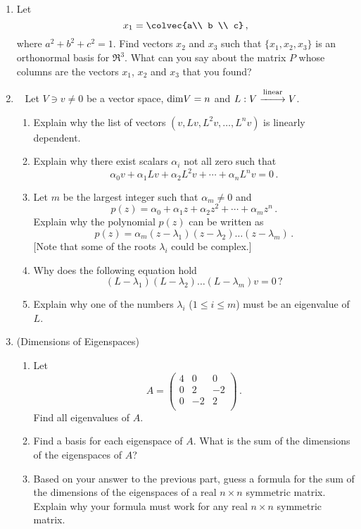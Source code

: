 \begin{enumerate}


\item Let $$x_1=\colvec{a\\ b \\ c}\, ,$$ where $a^2+b^2+c^2=1$.  Find vectors $x_2$ and $x_3$ such that $\{x_1,x_2,x_3\}$ is an orthonormal basis for $\Re^3$. What can you say about the matrix $P$ whose columns are the vectors $x_1$, $x_2$ and $x_3$ that you found?

\item~\label{atleastone} Let $V\ni v\neq0$ be a vector space, ${\rm dim} V=n$ and $L:V\stackrel{\rm linear}{-\!\!-\!\!\!\longrightarrow}V$.
\begin{enumerate}
\item Explain why the list of vectors $(v,Lv,L^2v,\ldots,L^n v)$ is linearly dependent.
\item Explain why there exist scalars $\alpha_i$ not all zero such that
$$
\alpha_0 v + \alpha_1 L v+\alpha_2 L^2 v+\cdots + \alpha_n L^n v=0\, .
$$
\item Let $m$ be the largest integer such that $\alpha_m\neq0$ and $$p(z)=\alpha_0+ \alpha_1 z + \alpha_2 z^2+\cdots + \alpha_m z^n \, .$$
Explain why the polynomial $p(z)$ can be written as
$$
p(z)=\alpha_m (z-\lambda_1)(z-\lambda_2)\ldots(z-\lambda_{m})\, .
$$
[Note that some of the roots $\lambda_i$ could be complex.]
\item Why does the following equation hold
$$
(L-\lambda_1)(L-\lambda_2)\ldots(L-\lambda_{m})
 v=0\, ?
$$
\item Explain why one of the numbers $\lambda_i$ ($1\leq i\leq m$) must be an eigenvalue of $L$.
\end{enumerate}




\item (Dimensions of Eigenspaces) \begin{enumerate}
\item Let $$A=
\begin{pmatrix}
4 & 0 & 0 \\
0 & 2 & -2 \\
0 & -2 & 2 \\
\end{pmatrix}\, .$$
Find all eigenvalues of \(A.\)
\item Find a basis for each eigenspace of \(A.\)  What is the sum of the dimensions of the eigenspaces of \(A\)?
\item Based on your answer to the previous part, guess a formula for the sum of the dimensions of the eigenspaces of a real \(n \times n\) symmetric matrix. Explain why your formula must work for any real \(n \times n\) symmetric matrix.
\end{enumerate}





\end{enumerate}
